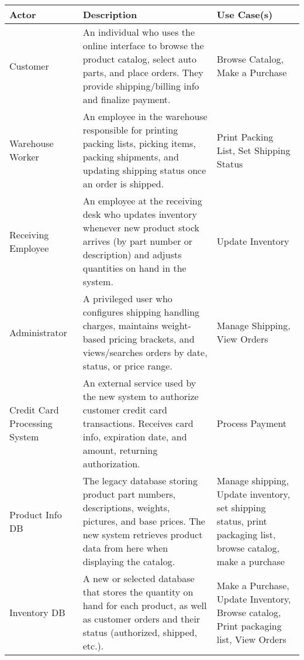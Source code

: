 \documentclass{report}
\begin{document}
    \pagebreak 
    \bigbreak \noindent 
    \begin{center}
        \begin{tabular}{|p{2cm}|p{7cm}|p{5.2cm}|}
            \hline
            Actor	&Description	&Use Case(s) \\
            \hline
            Customer&	An individual who uses the online interface to browse the product catalog, select auto parts, and place orders. They provide shipping/billing info and finalize payment.	&Browse Catalog, Make a Purchase \\
            \hline
            Warehouse Worker	&An employee in the warehouse responsible for printing packing lists, picking items, packing shipments, and updating shipping status once an order is shipped.	&Print Packing List, Set Shipping Status \\
            \hline
            Receiving Employee	&An employee at the receiving desk who updates inventory whenever new product stock arrives (by part number or description) and adjusts quantities on hand in the system.	&Update Inventory \\
            \hline
            Administrator	&A privileged user who configures shipping  handling charges, maintains weight-based pricing brackets, and views/searches orders by date, status, or price range.	&Manage Shipping, View Orders \\
            \hline
            Credit Card Processing System	&An external service used by the new system to authorize customer credit card transactions. Receives card info, expiration date, and amount, returning authorization.	&Process Payment \\
            \hline
            Product Info DB	&The legacy database storing product part numbers, descriptions, weights, pictures, and base prices. The new system retrieves product data from here when displaying the catalog.	&Manage shipping, Update inventory, set shipping status, print packaging list, browse catalog, make a purchase\\
            \hline
            Inventory DB	&A new or selected database that stores the quantity on hand for each product, as well as customer orders and their status (authorized, shipped, etc.).	&Make a Purchase, Update Inventory, Browse catalog, Print packaging list, View Orders \\
            \hline
        \end{tabular}
    \end{center}
\end{document}
